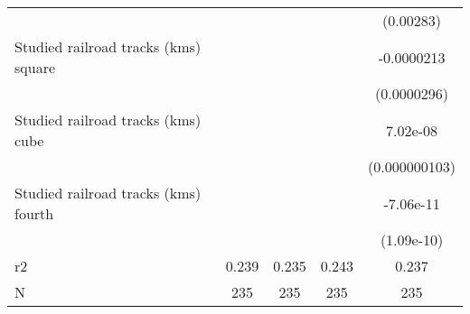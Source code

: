 {\begin{tabular}{l*{4}{c}}
                    &                     &                     &                     &   (0.00283)         \\
[1em]
Studied railroad tracks (kms) square&                     &                     &                     &  -0.0000213         \\
                    &                     &                     &                     & (0.0000296)         \\
[1em]
Studied railroad tracks (kms) cube&                     &                     &                     &    7.02e-08         \\
                    &                     &                     &                     &(0.000000103)         \\
[1em]
Studied railroad tracks (kms) fourth&                     &                     &                     &   -7.06e-11         \\
                    &                     &                     &                     &  (1.09e-10)         \\
\hline
r2                  &       0.239         &       0.235         &       0.243         &       0.237         \\
N                   &         235         &         235         &         235         &         235         \\
\hline\hline
\end{tabular}
}
